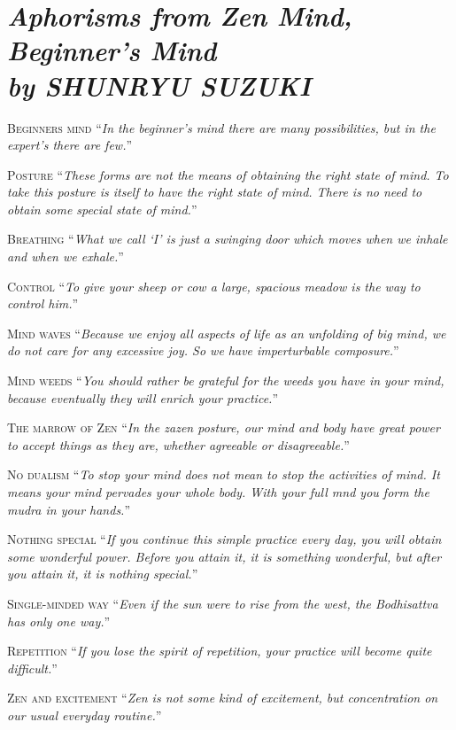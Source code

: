 \documentclass[14pt]{extarticle}
\newcommand{\aphor}[3]{
    \lettrine[lines=2, lraise=0.15]{#1}{#2}
    \enquote{\textit{#3}}
}
\begin{document}
\section*{\LARGE\sffamily\slshape Aphorisms from Zen Mind, Beginner's Mind \\ {\large by SHUNRYU SUZUKI }}
\aphor{B}{eginners mind} {In the beginner's mind there are many possibilities, but in the expert's there are few.}

\aphor{P}{osture} {These forms are not the means of obtaining the right state of mind. To take this posture is itself to have the right state of mind. There is no need to obtain some special state of mind.}

\aphor{B}{reathing} {What we call \enquote{I} is just a swinging door which moves when we inhale and when we exhale.}

\aphor{C}{ontrol} {To give your sheep or cow a large, spacious meadow is the way to control him.}

\aphor{M}{ind waves} {Because we enjoy all aspects of life as an unfolding of big mind, we do not care for any excessive joy. So we have imperturbable composure.} %

\aphor{M}{ind weeds} {You should rather be grateful for the weeds you have in your mind, because eventually they will enrich your practice.}


\aphor{T}{he marrow of Zen} {In the zazen posture, our mind and body have great power to accept things as they are, whether agreeable or disagreeable.}


\aphor{N}{o dualism} {To stop your mind does not mean to stop the activities of mind. It means your mind pervades your whole body. With your full mnd you form the mudra in your hands.}

\pagebreak

\aphor{N}{othing special} {If you continue this simple practice every day, you will obtain some wonderful power. Before you attain it, it is something wonderful, but after you attain it, it is nothing special.}

\aphor{S}{ingle-minded way} {Even if the sun were to rise from the west, the Bodhisattva has only one way.}

\aphor{R}{epetition} {If you lose the spirit of repetition, your practice will become quite difficult.}

\aphor{Z}{en and excitement} {Zen is not some kind of excitement, but concentration on our usual everyday routine.}
\end{document}
